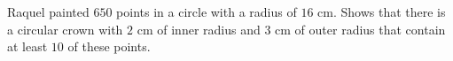 Raquel painted $650$ points in a circle with a radius of $16$ cm. Shows that there is a circular crown with $2$ cm of inner radius and $3$ cm of outer radius that contain at least $10$ of these points.
